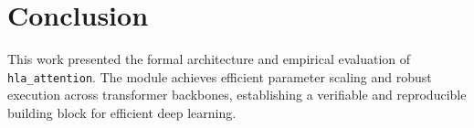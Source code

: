 \section{Conclusion}
This work presented the formal architecture and empirical evaluation of \texttt{hla_attention}. The module achieves efficient parameter scaling and robust execution across transformer backbones, establishing a verifiable and reproducible building block for efficient deep learning.
